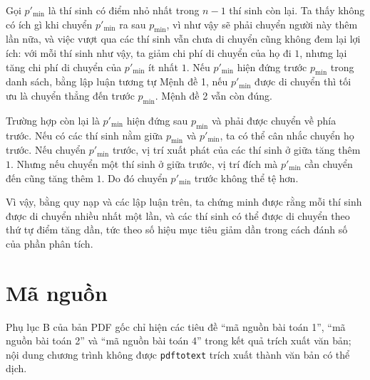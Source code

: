 \documentclass[11pt]{article}
\begin{document}
Gọi \(p'_{\min}\) là thí sinh có điểm nhỏ nhất trong \(n-1\) thí sinh còn lại.
Ta thấy không có ích gì khi chuyển \(p'_{\min}\) ra sau \(p_{\min}\), vì như
vậy sẽ phải chuyển người này thêm lần nữa, và việc vượt qua các thí sinh vẫn
chưa di chuyển cũng không đem lại lợi ích: với mỗi thí sinh như vậy, ta giảm
chi phí di chuyển của họ đi \(1\), nhưng lại tăng chi phí di chuyển của
\(p'_{\min}\) ít nhất \(1\). Nếu \(p'_{\min}\) hiện đứng trước \(p_{\min}\)
trong danh sách, bằng lập luận tương tự Mệnh đề 1, nếu \(p'_{\min}\) được di
chuyển thì tối ưu là chuyển thẳng đến trước \(p_{\min}\). Mệnh đề 2 vẫn còn
đúng.

Trường hợp còn lại là \(p'_{\min}\) hiện đứng sau \(p_{\min}\) và phải được
chuyển về phía trước. Nếu có các thí sinh nằm giữa \(p_{\min}\) và
\(p'_{\min}\), ta có thể cân nhắc chuyển họ trước. Nếu chuyển \(p'_{\min}\)
trước, vị trí xuất phát của các thí sinh ở giữa tăng thêm \(1\). Nhưng nếu
chuyển một thí sinh ở giữa trước, vị trí đích mà \(p'_{\min}\) cần chuyển đến
cũng tăng thêm \(1\). Do đó chuyển \(p'_{\min}\) trước không thể tệ hơn.

Vì vậy, bằng quy nạp và các lập luận trên, ta chứng minh được rằng mỗi thí
sinh được di chuyển nhiều nhất một lần, và các thí sinh có thể được di chuyển
theo thứ tự điểm tăng dần, tức theo số hiệu mục tiêu giảm dần trong cách đánh
số của phần phân tích.

\section{Mã nguồn}

Phụ lục B của bản PDF gốc chỉ hiện các tiêu đề ``mã nguồn bài toán 1'', ``mã
nguồn bài toán 2'' và ``mã nguồn bài toán 4'' trong kết quả trích xuất văn
bản; nội dung chương trình không được \texttt{pdftotext} trích xuất thành văn
bản có thể dịch.
\end{document}
